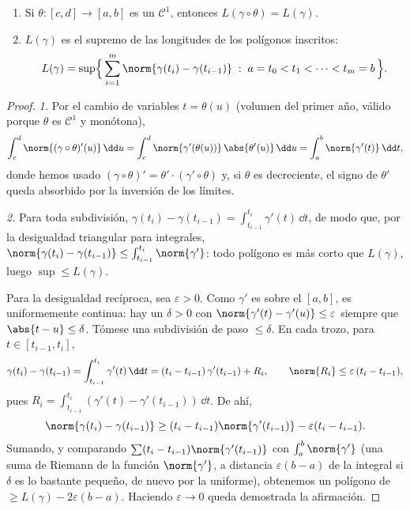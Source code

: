 \begin{theorem}\label{thm:b2:curves:lengthinv}
\leavevmode
\begin{enumerate}
\item Si $\theta \colon [c, d] \to [a, b]$ es un
 $\mathcal{C}^1$, entonces $L(\gamma \circ \theta)
= L(\gamma)$.
\item $L(\gamma)$ es el supremo de las longitudes de los polígonos
inscritos:
\[
L(\gamma)
= \sup\Bigl\{\, \sum_{i=1}^{m} \norm{\gamma(t_i) -
\gamma(t_{i-1})} \;:\; a = t_0 < t_1 < \dots < t_m = b \,\Bigr\}.
\]
\end{enumerate}
\end{theorem}

\begin{proof}
\emph{1.} Por el cambio de variables $t = \theta(u)$ (volumen del
primer año, válido porque $\theta$ es $\mathcal{C}^1$ y monótona),
\[
\int_c^d \norm{(\gamma\circ\theta)'(u)}\,\dd u
= \int_c^d \norm{\gamma'(\theta(u))}\,\abs{\theta'(u)}\,\dd u
= \int_a^b \norm{\gamma'(t)}\,\dd t ,
\]
donde hemos usado $(\gamma\circ\theta)' = \theta'\cdot
(\gamma'\circ\theta)$ y, si $\theta$ es decreciente, el signo de
$\theta'$ queda absorbido por la inversión de los límites.

\emph{2.} Para toda subdivisión, $\gamma(t_i) - \gamma(t_{i-1}) =
\int_{t_{i-1}}^{t_i}\gamma'(t)\,\dd t$, de modo que, por la
desigualdad triangular para integrales, $\norm{\gamma(t_i) -
\gamma(t_{i-1})} \leq \int_{t_{i-1}}^{t_i}\norm{\gamma'}$: todo
polígono es más corto que $L(\gamma)$, luego $\sup \leq L(\gamma)$.

Para la desigualdad recíproca, sea $\varepsilon > 0$. Como
$\gamma'$ es  sobre el  $[a,b]$, es uniformemente
continua: hay un $\delta > 0$ con $\norm{\gamma'(t) - \gamma'(u)}
\leq \varepsilon$ siempre que $\abs{t - u} \leq \delta$. Tómese una
subdivisión de paso $\leq \delta$. En cada trozo, para $t \in
[t_{i-1}, t_i]$,
\[
\gamma(t_i) - \gamma(t_{i-1})
= \int_{t_{i-1}}^{t_i}\gamma'(t)\,\dd t
= (t_i - t_{i-1})\,\gamma'(t_{i-1}) + R_i,
\qquad
\norm{R_i} \leq \varepsilon\,(t_i - t_{i-1}),
\]
pues $R_i = \int_{t_{i-1}}^{t_i}(\gamma'(t) -
\gamma'(t_{i-1}))\,\dd t$. De ahí,
\[
\norm{\gamma(t_i) - \gamma(t_{i-1})}
\geq (t_i - t_{i-1})\norm{\gamma'(t_{i-1})}
- \varepsilon (t_i - t_{i-1}) .
\]
Sumando, y comparando $\sum (t_i -
t_{i-1})\norm{\gamma'(t_{i-1})}$ con $\int_a^b\norm{\gamma'}$ (una
suma de Riemann de la función  $\norm{\gamma'}$, a distancia
$\varepsilon(b - a)$ de la integral si $\delta$ es lo bastante
pequeño, de nuevo por la  uniforme), obtenemos un polígono
de  $\geq L(\gamma) - 2\varepsilon(b - a)$. Haciendo
$\varepsilon \to 0$ queda demostrada la afirmación.
\end{proof}

